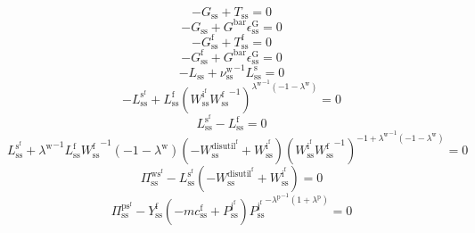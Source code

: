 \begin{equation}
-G_\mathrm{ss} + T_\mathrm{ss} = 0
\end{equation}
\begin{equation}
-G_\mathrm{ss} + {G^{\mathrm{bar}}} {\epsilon^{\mathrm{G}}_\mathrm{ss}} = 0
\end{equation}
\begin{equation}
-G^{\mathrm{f}}_\mathrm{ss} + T^{\mathrm{f}}_\mathrm{ss} = 0
\end{equation}
\begin{equation}
-G^{\mathrm{f}}_\mathrm{ss} + {G^{\mathrm{bar}}} {\epsilon^{\mathrm{G}}_\mathrm{ss}} = 0
\end{equation}
\begin{equation}
-L_\mathrm{ss} + {\nu^{\mathrm{w}}_\mathrm{ss}}^{-1} {L^{\mathrm{s}}_\mathrm{ss}} = 0
\end{equation}
\begin{equation}
-L^{\mathrm{s}^{\mathrm{f}}}_\mathrm{ss} + {L^{\mathrm{f}}_\mathrm{ss}} {\left({W^{\mathrm{i}^{\mathrm{f}}}_\mathrm{ss}} {W^{\mathrm{f}}_\mathrm{ss}}^{-1}\right)^{{\lambda^{\mathrm{w}}}^{-1} \left(-1 - \lambda^{\mathrm{w}}\right)}} = 0
\end{equation}
\begin{equation}
L^{\mathrm{s}^{\mathrm{f}}}_\mathrm{ss} - L^{\mathrm{f}}_\mathrm{ss} = 0
\end{equation}
\begin{equation}
L^{\mathrm{s}^{\mathrm{f}}}_\mathrm{ss} + {\lambda^{\mathrm{w}}}^{-1} {L^{\mathrm{f}}_\mathrm{ss}} {W^{\mathrm{f}}_\mathrm{ss}}^{-1} \left(-1 - \lambda^{\mathrm{w}}\right) \left(-W^{\mathrm{disutil}^{\mathrm{f}}}_\mathrm{ss} + W^{\mathrm{i}^{\mathrm{f}}}_\mathrm{ss}\right) {\left({W^{\mathrm{i}^{\mathrm{f}}}_\mathrm{ss}} {W^{\mathrm{f}}_\mathrm{ss}}^{-1}\right)^{-1 + {\lambda^{\mathrm{w}}}^{-1} \left(-1 - \lambda^{\mathrm{w}}\right)}} = 0
\end{equation}
\begin{equation}
\Pi^{\mathrm{ws}^{\mathrm{f}}}_\mathrm{ss} - {L^{\mathrm{s}^{\mathrm{f}}}_\mathrm{ss}} \left(-W^{\mathrm{disutil}^{\mathrm{f}}}_\mathrm{ss} + W^{\mathrm{i}^{\mathrm{f}}}_\mathrm{ss}\right) = 0
\end{equation}
\begin{equation}
\Pi^{\mathrm{ps}^{\mathrm{f}}}_\mathrm{ss} - {Y^{\mathrm{f}}_\mathrm{ss}} \left(-{m\!c}^{\mathrm{f}}_\mathrm{ss} + P^{\mathrm{j}^{\mathrm{f}}}_\mathrm{ss}\right) {{P^{\mathrm{j}^{\mathrm{f}}}_\mathrm{ss}}^{-{\lambda^{\mathrm{p}}}^{-1} \left(1 + \lambda^{\mathrm{p}}\right)}} = 0
\end{equation}

